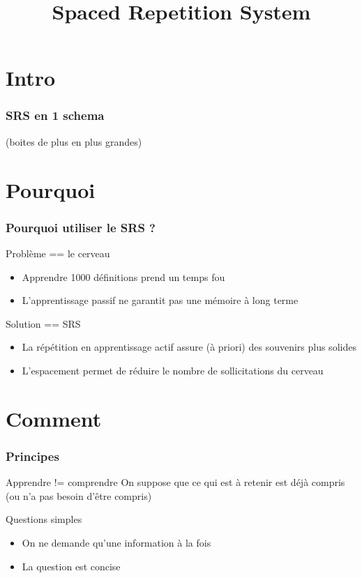 \documentclass[12pt]{beamer}
\title{Spaced Repetition System}
\begin{document}
\frame{\titlepage}








\section{Intro}

\begin{frame}
  \frametitle{SRS en 1 schema}
  (boites de plus en plus grandes)
\end{frame}

\section{Pourquoi}
\begin{frame}
  \frametitle{Pourquoi utiliser le SRS ?}
  \begin{block}{Problème == le cerveau}
    \begin{itemize}
      \item Apprendre 1000 définitions prend un temps fou
      \item L'apprentissage passif ne garantit pas une mémoire à long terme
    \end{itemize}
  \end{block}
  
  \begin{block}{Solution == SRS}
    \begin{itemize}
      \item La répétition en apprentissage actif assure (à priori) des souvenirs plus solides
      \item L'espacement permet de réduire le nombre de sollicitations du cerveau
    \end{itemize}
  \end{block}
\end{frame}

\section{Comment}
\begin{frame}
  \frametitle{Principes}
  \begin{block}{Apprendre != comprendre}
   On suppose que ce qui est à retenir est déjà compris (ou n'a pas besoin d'être compris)
  \end{block}

  \begin{block}{Questions simples}
    \begin{itemize}
      \item On ne demande qu'une information à la fois
      \item La question est concise
    \end{itemize}
  \end{block}
\end{frame}
\end{document}
